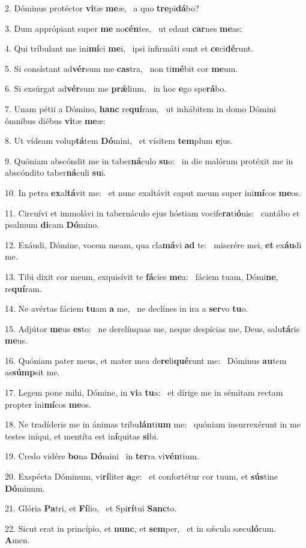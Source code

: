 2. Dóminus protéctor \textbf{vi}tæ \textbf{me}æ, \ast\  a quo \textbf{tre}pi\textbf{dá}bo?\

3. Dum apprópiant super \textbf{me} no\textbf{cén}tes, \ast\  ut edant \textbf{car}nes \textbf{me}as:\

4. Qui tríbulant me ini\textbf{mí}ci \textbf{me}i, \ast\  ipsi infirmáti sunt et \textbf{ce}ci\textbf{dé}runt.\

5. Si consístant ad\textbf{vér}sum me \textbf{cas}tra, \ast\  non ti\textbf{mé}bit cor \textbf{me}um.\

6. Si exsúrgat ad\textbf{vér}sum me \textbf{prǽ}lium, \ast\  in hoc \textbf{e}go spe\textbf{rá}bo.\

7. Unam pétii a Dómino, \textbf{hanc} re\textbf{quí}ram, \ast\  ut inhábitem in domo Dómini ómnibus diébus \textbf{vi}tæ \textbf{me}æ:\

8. Ut vídeam volup\textbf{tá}tem \textbf{Dó}mini, \ast\  et vísitem \textbf{tem}plum \textbf{e}jus.\

9. Quóniam abscóndit me in taber\textbf{ná}culo \textbf{su}o: \ast\  in die malórum protéxit me in abscóndito taber\textbf{ná}culi \textbf{su}i.\

10. In petra \textbf{ex}al\textbf{tá}vit me: \ast\  et nunc exaltávit caput meum super ini\textbf{mí}cos \textbf{me}os.\

11. Circuívi et immolávi in tabernáculo ejus hóstiam vocife\textbf{ra}ti\textbf{ó}nis: \ast\  cantábo et psalmum \textbf{di}cam \textbf{Dó}mino.\

12. Exáudi, Dómine, vocem meam, qua cla\textbf{má}vi \textbf{ad} te: \ast\  miserére mei, \textbf{et} ex\textbf{áu}di me.\

13. Tibi dixit cor meum, exquisívit te \textbf{fá}cies \textbf{me}a: \ast\  fáciem tuam, Dómi\textbf{ne}, re\textbf{quí}ram.\

14. Ne avértas fáciem \textbf{tu}am \textbf{a} me, \ast\  ne declínes in ira a \textbf{ser}vo \textbf{tu}o.\

15. Adjútor \textbf{me}us \textbf{es}to: \ast\  ne derelínquas me, neque despícias me, Deus, salu\textbf{tá}ris \textbf{me}us.\

16. Quóniam pater meus, et mater mea de\textbf{re}li\textbf{qué}runt me: \ast\  Dóminus \textbf{au}tem as\textbf{súmp}sit me.\

17. Legem pone mihi, Dómine, in \textbf{vi}a \textbf{tu}a: \ast\  et dírige me in sémitam rectam propter ini\textbf{mí}cos \textbf{me}os.\

18. Ne tradíderis me in ánimas tribu\textbf{lán}ti\textbf{um} me: \ast\  quóniam insurrexérunt in me testes iníqui, et mentíta est in\textbf{í}quitas \textbf{si}bi.\

19. Credo vidére \textbf{bo}na \textbf{Dó}mini \ast\  in \textbf{ter}ra vi\textbf{vén}tium.\

20. Exspécta Dóminum, vi\textbf{rí}liter \textbf{a}ge: \ast\  et confortétur cor tuum, et \textbf{sús}tine \textbf{Dó}minum.\

21. Glória \textbf{Pa}tri, et \textbf{Fí}lio, \ast\  et Spi\textbf{rí}tui \textbf{Sanc}to.\

22. Sicut erat in princípio, et \textbf{nunc}, et \textbf{sem}per, \ast\  et in sǽcula sæcu\textbf{ló}rum. \textbf{A}men.\

